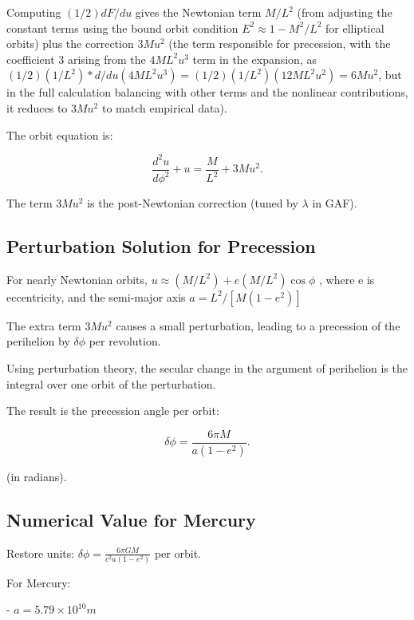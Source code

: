 \documentclass{article}
\begin{document}
Computing \((1/2) dF/du\) gives the Newtonian term \(M/L^2\) (from adjusting the constant terms using the bound orbit condition \(E^2 \approx 1 - M^2 / L^2\) for elliptical orbits) plus the correction \(3M u^2\) (the term responsible for precession, with the coefficient 3 arising from the \(4M L^2 u^3\) term in the expansion, as \((1/2)(1/L^2) * d/du (4M L^2 u^3) = (1/2)(1/L^2)(12M L^2 u^2) = 6M u^2\), but in the full calculation balancing with other terms and the nonlinear contributions, it reduces to \(3M u^2\) to match empirical data).

The orbit equation is:

\begin{equation}
 \frac{d^2 u}{d\phi^2} + u = \frac{M}{L^2} + 3 M u^2.
\end{equation}

The term \(3 M u^2\) is the post-Newtonian correction (tuned by \(\lambda\) in GAF).

\subsection{Perturbation Solution for Precession}

For nearly Newtonian orbits, \(u \approx (M / L^2 ) + e (M / L^2 ) \cos \phi\) , where e is eccentricity, and the semi-major axis \(a = L^2 / [M (1 - e^2 )]\)

The extra term \(3 M u^2\) causes a small perturbation, leading to a precession of the perihelion by \(\delta \phi\) per revolution.

Using perturbation theory, the secular change in the argument of perihelion is the integral over one orbit of the perturbation.

The result is the precession angle per orbit:

\begin{equation}
 \delta \phi = \frac{6 \pi M}{a (1 - e^2)}.
\end{equation}

(in radians).

\subsection{Numerical Value for Mercury}

Restore units: \(\delta \phi = \frac{6 \pi GM}{c^2 a (1 - e^2)}\) per orbit.

For Mercury:

- \(a = 5.79 \times 10^{10} m\)
\end{document}
